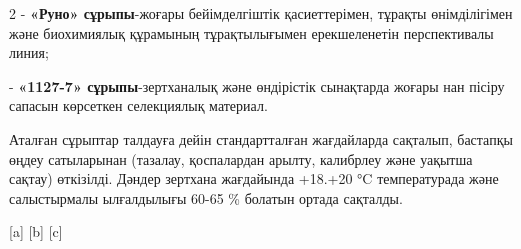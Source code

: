 \begin{multicols}{2}
- {\bfseries «Руно» сұрыпы}-жоғары бейімделгіштік қасиеттерімен, тұрақты
өнімділігімен және биохимиялық құрамының тұрақтылығымен ерекшеленетін
перспективалы линия;

- {\bfseries «1127-7» сұрыпы}-зертханалық және өндірістік сынақтарда жоғары
нан пісіру сапасын көрсеткен селекциялық материал.

Аталған сұрыптар талдауға дейін стандартталған жағдайларда сақталып,
бастапқы өңдеу сатыларынан (тазалау, қоспалардан арылту, калибрлеу және
уақытша сақтау) өткізілді. Дәндер зертхана жағдайында +18.+20 °C
температурада және салыстырмалы ылғалдылығы 60-65 \% болатын ортада
сақталды.
\end{multicols}

\begin{figs}
[a]
[b]
[c]
\end{figs}

